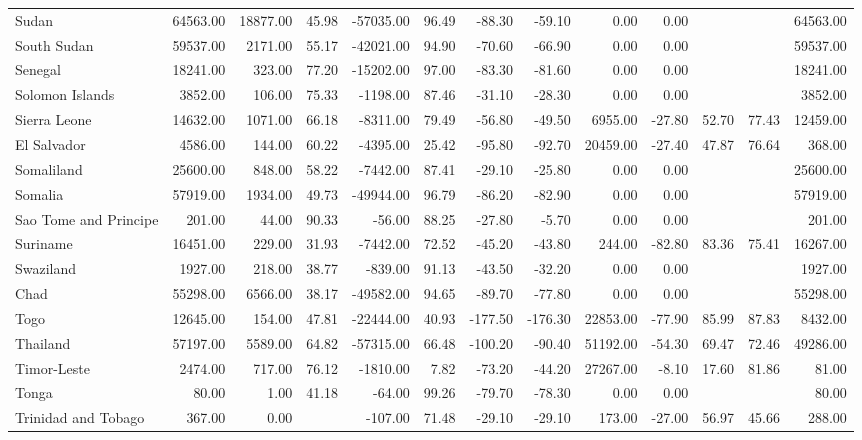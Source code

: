 \begin{table}[ht]
\begin{tabular}{lrrrrrrrrrrrr}
  Sudan & 64563.00 & 18877.00 & 45.98 & -57035.00 & 96.49 & -88.30 & -59.10 & 0.00 & 0.00 &  &  & 64563.00 \\ 
  South Sudan & 59537.00 & 2171.00 & 55.17 & -42021.00 & 94.90 & -70.60 & -66.90 & 0.00 & 0.00 &  &  & 59537.00 \\ 
  Senegal & 18241.00 & 323.00 & 77.20 & -15202.00 & 97.00 & -83.30 & -81.60 & 0.00 & 0.00 &  &  & 18241.00 \\ 
  Solomon Islands & 3852.00 & 106.00 & 75.33 & -1198.00 & 87.46 & -31.10 & -28.30 & 0.00 & 0.00 &  &  & 3852.00 \\ 
  Sierra Leone & 14632.00 & 1071.00 & 66.18 & -8311.00 & 79.49 & -56.80 & -49.50 & 6955.00 & -27.80 & 52.70 & 77.43 & 12459.00 \\ 
  El Salvador & 4586.00 & 144.00 & 60.22 & -4395.00 & 25.42 & -95.80 & -92.70 & 20459.00 & -27.40 & 47.87 & 76.64 & 368.00 \\ 
  Somaliland & 25600.00 & 848.00 & 58.22 & -7442.00 & 87.41 & -29.10 & -25.80 & 0.00 & 0.00 &  &  & 25600.00 \\ 
  Somalia & 57919.00 & 1934.00 & 49.73 & -49944.00 & 96.79 & -86.20 & -82.90 & 0.00 & 0.00 &  &  & 57919.00 \\ 
  Sao Tome and Principe & 201.00 & 44.00 & 90.33 & -56.00 & 88.25 & -27.80 & -5.70 & 0.00 & 0.00 &  &  & 201.00 \\ 
  Suriname & 16451.00 & 229.00 & 31.93 & -7442.00 & 72.52 & -45.20 & -43.80 & 244.00 & -82.80 & 83.36 & 75.41 & 16267.00 \\ 
  Swaziland & 1927.00 & 218.00 & 38.77 & -839.00 & 91.13 & -43.50 & -32.20 & 0.00 & 0.00 &  &  & 1927.00 \\ 
  Chad & 55298.00 & 6566.00 & 38.17 & -49582.00 & 94.65 & -89.70 & -77.80 & 0.00 & 0.00 &  &  & 55298.00 \\ 
  Togo & 12645.00 & 154.00 & 47.81 & -22444.00 & 40.93 & -177.50 & -176.30 & 22853.00 & -77.90 & 85.99 & 87.83 & 8432.00 \\ 
  Thailand & 57197.00 & 5589.00 & 64.82 & -57315.00 & 66.48 & -100.20 & -90.40 & 51192.00 & -54.30 & 69.47 & 72.46 & 49286.00 \\ 
  Timor-Leste & 2474.00 & 717.00 & 76.12 & -1810.00 & 7.82 & -73.20 & -44.20 & 27267.00 & -8.10 & 17.60 & 81.86 & 81.00 \\ 
  Tonga & 80.00 & 1.00 & 41.18 & -64.00 & 99.26 & -79.70 & -78.30 & 0.00 & 0.00 &  &  & 80.00 \\ 
  Trinidad and Tobago & 367.00 & 0.00 &  & -107.00 & 71.48 & -29.10 & -29.10 & 173.00 & -27.00 & 56.97 & 45.66 & 288.00 \\ 

\end{tabular}
\end{table}
